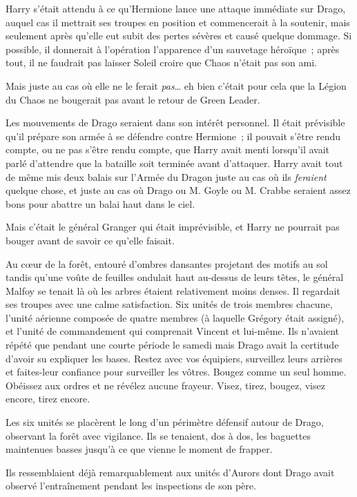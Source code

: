 Harry s'était attendu à ce qu'Hermione lance une attaque immédiate sur Drago, auquel cas il mettrait ses troupes en position et commencerait à la soutenir, mais seulement après qu'elle eut subit des pertes sévères et causé quelque dommage.
Si possible, il donnerait à l'opération l'apparence d'un sauvetage héroïque~; après tout, il ne faudrait pas laisser Soleil croire que Chaos n'était pas son ami.

Mais juste au cas où elle ne le ferait \emph{pas}… eh bien c'était pour cela que la Légion du Chaos ne bougerait pas avant le retour de Green Leader.

Les mouvements de Drago seraient dans son intérêt personnel.
Il était prévisible qu'il prépare son armée à se défendre contre Hermione~; il pouvait s'être rendu compte, ou ne pas s'être rendu compte, que Harry avait menti lorsqu'il avait parlé d'attendre que la bataille soit terminée avant d'attaquer.
Harry avait tout de même mis deux balais sur l'Armée du Dragon juste au cas où ils \emph{feraient} quelque chose, et juste au cas où Drago ou M. Goyle ou M. Crabbe seraient assez bons pour abattre un balai haut dans le ciel.

Mais c'était le général Granger qui était imprévisible, et Harry ne pourrait pas bouger avant de savoir ce qu'elle faisait.

\later

Au cœur de la forêt, entouré d'ombres dansantes projetant des motifs au sol tandis qu'une voûte de feuilles ondulait haut au-dessus de leurs têtes, le général Malfoy se tenait là où les arbres étaient relativement moins denses.
Il regardait ses troupes avec une calme satisfaction.
Six unités de trois membres chacune, l'unité aérienne composée de quatre membres (à laquelle Grégory était assigné), et l'unité de commandement qui comprenait Vincent et lui-même.
Ils n'avaient répété que pendant une courte période le samedi mais Drago avait la certitude d'avoir su expliquer les bases.
Restez avec vos équipiers, surveillez leurs arrières et faites-leur confiance pour surveiller les vôtres.
Bougez comme un seul homme.
Obéissez aux ordres et ne révélez aucune frayeur.
Visez, tirez, bougez, visez encore, tirez encore.

Les six unités se placèrent le long d'un périmètre défensif autour de Drago, observant la forêt avec vigilance.
Ils se tenaient, dos à dos, les baguettes maintenues basses jusqu'à ce que vienne le moment de frapper.

Ils ressemblaient déjà remarquablement aux unités d'Aurors dont Drago avait observé l'entraînement pendant les inspections de son père.

